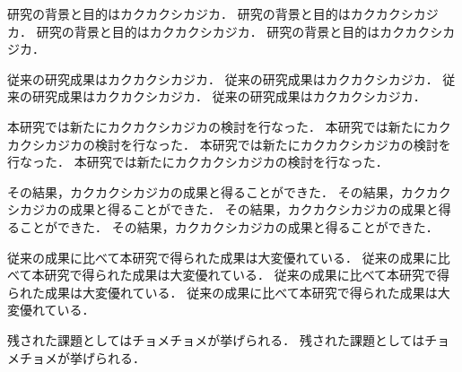 研究の背景と目的はカクカクシカジカ．
研究の背景と目的はカクカクシカジカ．
研究の背景と目的はカクカクシカジカ．
研究の背景と目的はカクカクシカジカ．

従来の研究成果はカクカクシカジカ．
従来の研究成果はカクカクシカジカ．
従来の研究成果はカクカクシカジカ．
従来の研究成果はカクカクシカジカ．

本研究では新たにカクカクシカジカの検討を行なった．
本研究では新たにカクカクシカジカの検討を行なった．
本研究では新たにカクカクシカジカの検討を行なった．
本研究では新たにカクカクシカジカの検討を行なった．

その結果，カクカクシカジカの成果と得ることができた．
その結果，カクカクシカジカの成果と得ることができた．
その結果，カクカクシカジカの成果と得ることができた．
その結果，カクカクシカジカの成果と得ることができた．

従来の成果に比べて本研究で得られた成果は大変優れている．
従来の成果に比べて本研究で得られた成果は大変優れている．
従来の成果に比べて本研究で得られた成果は大変優れている．
従来の成果に比べて本研究で得られた成果は大変優れている．

残された課題としてはチョメチョメが挙げられる．
残された課題としてはチョメチョメが挙げられる．
